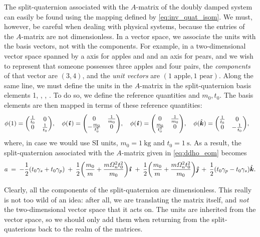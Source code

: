The split-quaternion associated with the \(A\)-matrix of the doubly damped system can easily be found using the mapping defined by \cref{eq:inv_quat_isom}. We must, however, be careful when dealing with physical systems, because the entries of the \(A\)-matrix are not dimensionless. In a vector space, we associate the units with the basis vectors, not with the components. For example, in a two-dimensional vector space spanned by a axis for apples and and an axis for pears, and we wish to represent that someone possesses three apples and four pairs, the \emph{components} of that vector are \((3, 4)\), and the \emph{unit vectors} are \((1 \text{ apple}, 1\text{ pear})\). Along the same line, we must define the units in the \(A\)-matrix in the split-quaternion basis elements 1, \quati, \quatj, \quatk. To do so, we define the reference quantities and \(m_0, t_0\). The basis elements are then mapped in terms of these reference quantities:
\begin{equation}
     \phi(1) = \mqty(\tfrac{1}{t_0} & 0 \\ 0 & \tfrac{1}{t_0}), \quad 
    \phi(\quati) = \mqty(0 & \tfrac{1}{m_0} \\  -\tfrac{m_0}{t_0^2} & 0), \quad
    \phi(\quati) = \mqty(0 & \tfrac{1}{m_0} \\  \tfrac{m_0}{t_0^2} & 0), \quad
    \phi(\quatk) = \mqty(\tfrac{1}{t_0} & 0 \\ 0 & -\tfrac{1}{t_0}), \quad
\end{equation}
where, in case we would use SI units, \(m_0 = \SI{1}{\kilogram}\) and \(t_0 = \SI{1}{\second}\). As a result, the split-quaternion associated with the \(A\)-matrix given in \cref{eq:ddho_eom} becomes
\begin{equation}
    a\:=\: -\frac{1}{2}\qty(t_0\gamma_s + t_0\gamma_p)\:+\:\frac{1}{2}\qty(\frac{m_0}{m} + \frac{m\Omega_n^2 t_0^2}{m_0})\quati\:+\:\frac{1}{2}\qty(\frac{m_0}{m} + \frac{m\Omega_n^2 t_0^2}{m_0})\quatj\:+\:\frac{1}{2}\qty(t_0\gamma_p - t_0\gamma_s)\quatk. 
    \label{eq:ddho_quat_units}
\end{equation}

Clearly, all the components of the split-quaternion are dimensionless. This really is not too wild of an idea: after all, we are translating the matrix itself, and \emph{not} the two-dimensional vector space that it acts on. The units are inherited from the vector space, so we should only add them when returning from the split-quaterions back to the realm of the matrices. 

